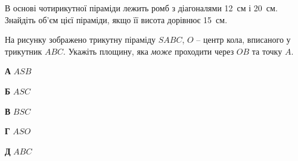 \documentclass[12pt]{article}
\begin{document}
\begin{samepage}
\noindent\zadnum В основі чотирикутної піраміди лежить ромб з діагоналями 12~см і 20~см. Знайдіть об’єм цієї піраміди, якщо її висота дорівнює 15~см. 

\nmtnobreak
\nopagebreak\nbvspace{0.3cm}
\par{}
\end{samepage}

\begin{samepage}
\noindent\zadnum \begin{minipage}[t]{0.52\textwidth}
На рисунку зображено трикутну піраміду $SABC$, $O$ – центр кола, вписаного у трикутник $ABC$. Укажіть площину, яка \textit{може} проходити через $OB$ та точку $A$. 

\nopagebreak\nbvspace{0.3cm}
\textbf{А} \quad $ASB$

\textbf{Б} \quad $ASC$

\textbf{В} \quad $BSC$

\textbf{Г} \quad $ASO$

\textbf{Д} \quad $ABC$
\end{minipage}
\hfill
\begin{minipage}[t]{0.40\textwidth}
\nopagebreak\nbvspace{-0.3cm}
\begin{center}
\begin{nmtfit}\end{nmtfit}
\end{center}
\end{minipage}
\par{}\vspace{0.25cm}
\end{samepage}
\end{document}

